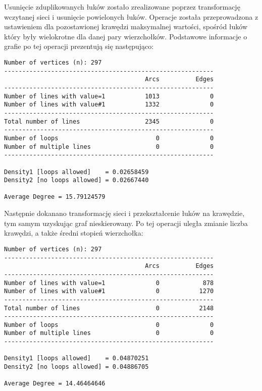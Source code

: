 \documentclass[10pt,a4paper]{article}
\begin{document}
Usunięcie zduplikowanych łuków zostało zrealizowane poprzez transformację wczytanej sieci i usunięcie powielonych łuków. Operacje została przeprowadzona z ustawieniem dla pozostawionej krawędzi maksymalnej wartości, spośród łuków który były wielokrotne dla danej pary wierzchołków. Podstawowe informacje o grafie po tej operacji prezentują się następująco:
\begin{verbatim}
Number of vertices (n): 297
----------------------------------------------------------
                                       Arcs          Edges
----------------------------------------------------------
Number of lines with value=1           1013              0
Number of lines with value#1           1332              0
----------------------------------------------------------
Total number of lines                  2345              0
----------------------------------------------------------
Number of loops                           0              0
Number of multiple lines                  0              0
----------------------------------------------------------

Density1 [loops allowed]    = 0.02658459
Density2 [no loops allowed] = 0.02667440

Average Degree = 15.79124579
\end{verbatim}

Następnie dokanano transformację sieci i przekształcenie łuków na krawędzie, tym samym uzyskując graf nieskierowany. Po tej operacji uległa zmianie liczba krawędzi, a także średni stopień wierzchołka:
\begin{verbatim}
Number of vertices (n): 297
----------------------------------------------------------
                                       Arcs          Edges
----------------------------------------------------------
Number of lines with value=1              0            878
Number of lines with value#1              0           1270
----------------------------------------------------------
Total number of lines                     0           2148
----------------------------------------------------------
Number of loops                           0              0
Number of multiple lines                  0              0
----------------------------------------------------------

Density1 [loops allowed]    = 0.04870251
Density2 [no loops allowed] = 0.04886705

Average Degree = 14.46464646
\end{verbatim}
\end{document}
